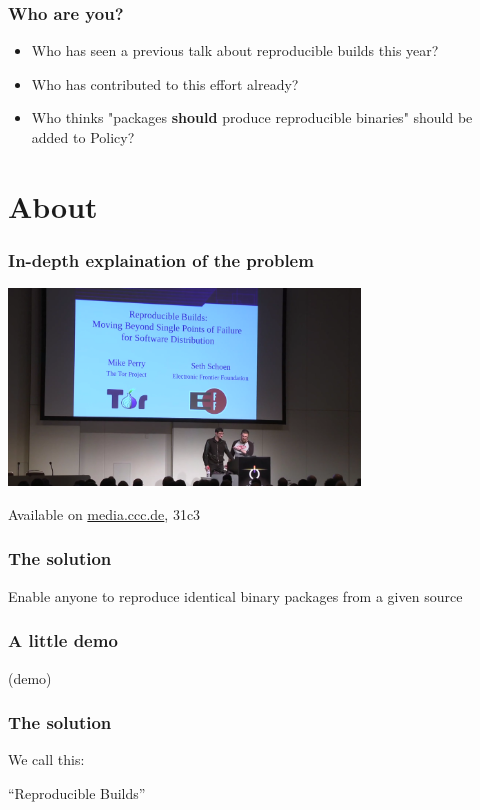 \documentclass[14pt]{beamer}
\begin{document}
\begin{frame}
 \frametitle{Who are you?}
 \begin{itemize}
  \item Who has seen a previous talk about reproducible builds this year?
  \item<2-3> Who has contributed to this effort already?
  \item<3> Who thinks "packages \textbf{should} produce reproducible binaries"
    should be added to Policy?
 \end{itemize}
\end{frame}

\section{About}

\begin{frame}
 \frametitle{In-depth explaination of the problem}

 \begin{center}
  \includegraphics[width=0.7\textwidth]{images/31c3.png}

  Available on \url{media.ccc.de}, 31c3
 \end{center}
\end{frame}

\begin{frame}
 \frametitle{The solution}

 \begin{center}
 \Large{
 Enable anyone to reproduce
 identical binary packages
 from a given source}
\end{center}
\end{frame}


\begin{frame}
 \frametitle{A little demo}

  (demo)
\end{frame}


\begin{frame}
 \frametitle{The solution}

 \begin{center}
 We call this:

 \Huge{ “Reproducible Builds” }
 \end{center}
\end{frame}
\end{document}
